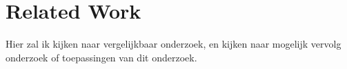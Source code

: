 \chapter{Related Work}\label{relatedwork}
Hier zal ik kijken naar vergelijkbaar onderzoek, en kijken naar mogelijk vervolg onderzoek of toepassingen van dit onderzoek.
